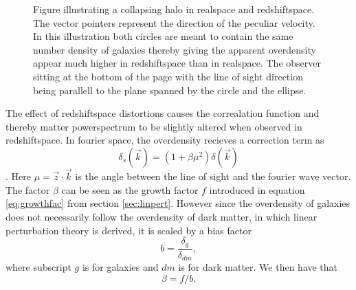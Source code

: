 \begin{figure}[htbp]\label{fig:rsddistortion}
    \caption{Figure illustrating a collapsing halo in realspace and redshiftspace. The vector pointers represent the direction of the peculiar velocity. In this illustration both circles are meant to contain the same number density of galaxies thereby giving the apparent overdensity appear much higher in redshiftspace than in realspace. The observer sitting at the bottom of the page with the line of sight direction being parallell to the plane spanned by the circle and the ellipse.}
\end{figure}
The effect of redshiftspace distortions causes the correalation function and thereby
matter powerspectrum to be slightly altered when observed in redshiftspace. In
fourier space, the overdensity recieves a correction term as
\begin{equation}
    \delta_s(\vec{k})=(1+\beta\mu^2)\delta(\vec{k})
\end{equation}
\cite[p.~279]{Dodelson:1282338}. Here $\mu=\vec{z}\cdot\vec{k}$ is the angle
between the line of sight and the fourier wave vector. The factor $\beta$ can be
seen as the growth factor $f$ introduced in equation \ref{eq:growthfac} from
section \ref{sec:linpert}. However since the overdensity of galaxies does not
necessarily follow the overdensity of dark matter, in which linear perturbation
theory is derived, it is scaled by a bias factor
\begin{equation}\label{eq:bias}
    b=\frac{\delta_g}{\delta_{dm}},
\end{equation}
where subscript $g$ is for galaxies and $dm$ is for dark matter. We then have
that
\begin{equation}\label{eq:beta}
    \beta=f/b.
\end{equation} 
